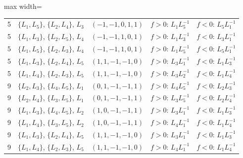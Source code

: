 \begin{table}[t]
\begin{adjustbox}{max width=\linewidth}
\begin{tabular}{@{}clcll@{}}
5 & $\{L_1,L_5\}$, $\{L_2,L_4\}$, $L_3$ & $(-1,-1,0,1,1)$ & $f>0$: $L_1L_5^{-1}$ & $f<0$: $L_5L_1^{-1}$\\
5 & $\{L_1,L_3\}$, $\{L_2,L_5\}$, $L_4$ & $(-1,-1,1,0,1)$ & $f>0$: $L_1L_3^{-1}$ & $f<0$: $L_3L_1^{-1}$\\
5 & $\{L_1,L_5\}$, $\{L_2,L_3\}$, $L_4$ & $(-1,-1,1,0,1)$ & $f>0$: $L_1L_5^{-1}$ & $f<0$: $L_5L_1^{-1}$\\
5 & $\{L_1,L_3\}$, $\{L_2,L_4\}$, $L_5$ & $(1,1,-1,-1,0)$ & $f>0$: $L_3L_1^{-1}$ & $f<0$: $L_1L_3^{-1}$\\
5 & $\{L_1,L_4\}$, $\{L_2,L_3\}$, $L_5$ & $(1,1,-1,-1,0)$ & $f>0$: $L_3L_2^{-1}$ & $f<0$: $L_1L_4^{-1}$\\
9 & $\{L_2,L_3\}$, $\{L_4,L_5\}$, $L_1$ & $(0,1,-1,-1,1)$ & $f>0$: $L_4L_5^{-1}$ & $f<0$: $L_2L_3^{-1}$\\
9 & $\{L_2,L_4\}$, $\{L_3,L_5\}$, $L_1$ & $(0,1,-1,-1,1)$ & $f>0$: $L_3L_5^{-1}$ & $f<0$: $L_2L_4^{-1}$\\
9 & $\{L_1,L_3\}$, $\{L_4,L_5\}$, $L_2$ & $(1,0,-1,-1,1)$ & $f>0$: $L_3L_1^{-1}$ & $f<0$: $L_1L_3^{-1}$\\
9 & $\{L_1,L_4\}$, $\{L_3,L_5\}$, $L_2$ & $(1,0,-1,-1,1)$ & $f>0$: $L_4L_1^{-1}$ & $f<0$: $L_1L_4^{-1}$\\
9 & $\{L_1,L_3\}$, $\{L_2,L_4\}$, $L_5$ & $(1,1,-1,-1,0)$ & $f>0$: $L_3L_1^{-1}$ & $f<0$: $L_1L_3^{-1}$\\
9 & $\{L_1,L_4\}$, $\{L_2,L_3\}$, $L_5$ & $(1,1,-1,-1,0)$ & $f>0$: $L_4L_1^{-1}$ & $f<0$: $L_1L_4^{-1}$\\
\bottomrule
\end{tabular}
\end{adjustbox}
\end{table}

